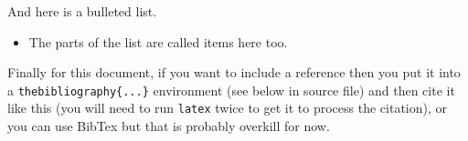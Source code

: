 \documentclass[a4wide, 11pt]{article}
\begin{document}
And here is a bulleted list.

\begin{itemize}

    \item
    The parts of the list are called items here too.
    
\end{itemize}

Finally for this document, if you want to include a reference
then you put it into a \texttt{thebibliography\{...\}}
environment (see below in source file) and then 
cite it like this \cite{lamport94}
(you will need to run \texttt{latex} twice to get it to process the citation),
or you can use BibTex but that is probably overkill for now.
\end{document}
